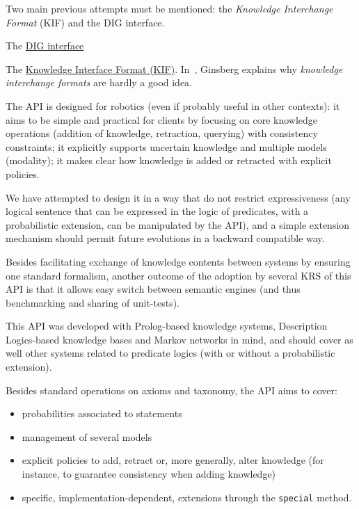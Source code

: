 Two main previous attempts must be mentioned: the \emph{Knowledge Interchange
Format} (KIF) and the DIG interface.

The \href{http://dig.sourceforge.net/}{ DIG interface}

The \href{http://logic.stanford.edu/kif/dpans.html}{ Knowledge Interface Format
(KIF)}. In~\cite{Ginsberg1991}, Ginsberg explains why \emph{knowledge
interchange formats} are hardly a good idea.

The API is designed for robotics (even if probably useful in other contexts):
it aims to be simple and practical for clients by focusing on core knowledge
operations (addition of knowledge, retraction, querying) with consistency
constraints; it explicitly supports uncertain knowledge and multiple models
(modality); it makes clear how knowledge is added or retracted with explicit
policies.

We have attempted to design it in a way that do not restrict expressiveness
(any logical sentence that can be expressed in the logic of predicates, with a
probabilistic extension, can be manipulated by the API), and a simple extension
mechanism should permit future evolutions in a backward compatible way.

Besides facilitating exchange of knowledge contents between systems by ensuring
one standard formalism, another outcome of the adoption by several KRS of this
API is that it allows easy switch between semantic engines (and thus
benchmarking and sharing of unit-tests).

This API was developed with Prolog-based knowledge systems, Description
Logics-based knowledge bases and Markov networks in mind, and should cover as
well other systems related to predicate logics (with or without a probabilistic
extension).

Besides standard operations on axioms and taxonomy, the API aims to cover:

\begin{itemize}
    \item  probabilities associated to statements
    \item  management of several models
    \item  explicit policies to add, retract or, more generally, alter 
    knowledge (for instance, to guarantee consistency when adding knowledge)
    \item  specific, implementation-dependent, extensions through the
    \texttt{special} method.
\end{itemize}

